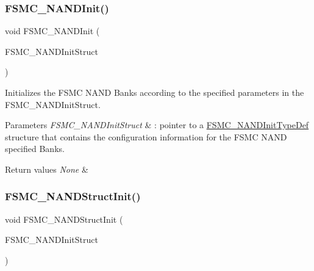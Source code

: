 \subsubsection{\texorpdfstring{FSMC\_NANDInit()}{FSMC\_NANDInit()}}
{\footnotesize\ttfamily void F\+S\+M\+C\+\_\+\+N\+A\+N\+D\+Init (\begin{DoxyParamCaption}\item[{\mbox{\hyperlink{struct_f_s_m_c___n_a_n_d_init_type_def}{F\+S\+M\+C\+\_\+\+N\+A\+N\+D\+Init\+Type\+Def}} $\ast$}]{F\+S\+M\+C\+\_\+\+N\+A\+N\+D\+Init\+Struct }\end{DoxyParamCaption})}



Initializes the F\+S\+MC N\+A\+ND Banks according to the specified parameters in the F\+S\+M\+C\+\_\+\+N\+A\+N\+D\+Init\+Struct. 


\begin{DoxyParams}{Parameters}
{\em F\+S\+M\+C\+\_\+\+N\+A\+N\+D\+Init\+Struct} & \+: pointer to a \mbox{\hyperlink{struct_f_s_m_c___n_a_n_d_init_type_def}{F\+S\+M\+C\+\_\+\+N\+A\+N\+D\+Init\+Type\+Def}} structure that contains the configuration information for the F\+S\+MC N\+A\+ND specified Banks.\\
\hline
\end{DoxyParams}

\begin{DoxyRetVals}{Return values}
{\em None} & \\
\hline
\end{DoxyRetVals}
\mbox{\label{group___f_s_m_c___exported___functions_ga8283ad94ad8e83d49d5b77d1c7e17862}} 
\subsubsection{\texorpdfstring{FSMC\_NANDStructInit()}{FSMC\_NANDStructInit()}}
{\footnotesize\ttfamily void F\+S\+M\+C\+\_\+\+N\+A\+N\+D\+Struct\+Init (\begin{DoxyParamCaption}\item[{\mbox{\hyperlink{struct_f_s_m_c___n_a_n_d_init_type_def}{F\+S\+M\+C\+\_\+\+N\+A\+N\+D\+Init\+Type\+Def}} $\ast$}]{F\+S\+M\+C\+\_\+\+N\+A\+N\+D\+Init\+Struct }\end{DoxyParamCaption})}



